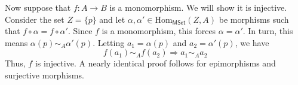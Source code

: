 \documentclass[../../master.tex]{subfiles}
\begin{document}
\begin{solution}
      Now suppose that \(f: A \to B\) is a monomorphism. We will show it is injective.
      Consider the set \(Z = \{p\}\) and let \(\alpha, \alpha' \in \text{Hom}_{\mathsf{MSet}}(Z, A)\) be morphisms such that \(f \circ \alpha = f \circ \alpha'\).
      Since \(f\) is a monomorphism, this forces \(\alpha = \alpha'\).
      In turn, this means \(\alpha(p) \sim_{A} \alpha'(p)\).
      Letting \(a_{1} = \alpha(p)\) and \(a_{2} = \alpha'(p)\), we have
      \begin{equation*}
        f(a_{1}) \sim_{A} f(a_{2}) \Longrightarrow a_{1} \sim_{A} a_{2}
      \end{equation*}
      Thus, \(f\) is injective.
      A nearly identical proof follows for epimorphisms and surjective morphisms.
    \end{solution}
\end{document}

